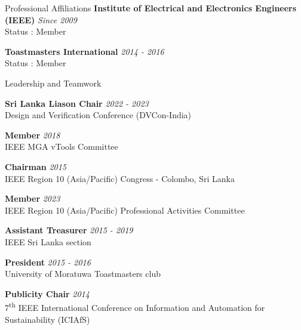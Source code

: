 \documentclass[
11pt, %
]{./../assets/resume} %
\begin{document}
\begin{rSection}{Professional Affiliations}
	\textbf{Institute of Electrical and Electronics Engineers (IEEE)} \hfill \textit{Since 2009}\\
	Status : Member
	
	
	\textbf{Toastmasters International} \hfill \textit{2014 - 2016}\\
	Status : Member
	
\end{rSection}


\begin{rSection}{Leadership and Teamwork}

\textbf{Sri Lanka Liason Chair} \hfill \textit{2022 - 2023} \\
Design and Verification Conference (DVCon-India)


\textbf{Member} \hfill \textit{2018} \\
IEEE MGA vTools Committee


\textbf{Chairman} \hfill \textit{2015} \\
IEEE Region 10 (Asia/Pacific) Congress - Colombo, Sri Lanka


\textbf{Member} \hfill \textit{2023} \\
IEEE Region 10 (Asia/Pacific) Professional Activities Committee

\textbf{Assistant Treasurer} \hfill \textit{2015 - 2019}\\
IEEE Sri Lanka section

\textbf{President} \hfill \textit{2015 - 2016} \\
University of Moratuwa Toastmasters club

\textbf{Publicity Chair} \hfill \textit{2014} \\
7\textsuperscript{th} IEEE International Conference on Information and Automation for Sustainability (ICIAfS)

\end{rSection}
\end{document}
